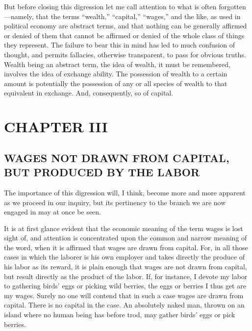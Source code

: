 But before closing this digression let me call attention to what is
often forgotten---namely, that the terms ``wealth,'' ``capital,''
``wages,'' and the like, as used in political economy are abstract
terms, and that nothing can be generally affirmed or denied of them that
cannot be affirmed or denied of the whole class of things they
represent. The failure to bear this in mind has led to much confusion of
thought, and permits fallacies, otherwise transparent, to pass for
obvious truths. Wealth being an abstract term, the idea of wealth, it
must be remembered, involves the idea of exchange ability. The
possession of wealth to a certain amount is potentially the possession
of any or all species of wealth to that equivalent in exchange. And,
consequently, so of capital.

\newpage

\hypertarget{Book1Chapter3}{%
\section{CHAPTER III}\label{Book1Chapter3}}

\hypertarget{wages-not-drawn-from-capital-but-produced-by-the-labor}{%
\subsection{WAGES NOT DRAWN FROM CAPITAL, BUT PRODUCED BY THE
LABOR}\label{wages-not-drawn-from-capital-but-produced-by-the-labor}}

The importance of this digression will, I think, become more and more
apparent as we proceed in our inquiry, but its pertinency to the branch
we are now engaged in may at once be seen.

It is at first glance evident that the economic meaning of the term
wages is lost sight of, and attention is concentrated upon the common
and narrow meaning of the word, when it is affirmed that wages are drawn
from capital. For, in all those cases in which the laborer is his own
employer and takes directly the produce of his labor as its reward, it
is plain enough that wages are not drawn from capital, but result
directly as the product of the labor. If, for instance, I devote my
labor to gathering birds' eggs or picking wild berries, the eggs or
berries I thus get are my wages. Surely no one will contend that in such
a case wages are drawn from capital. There is no capital in the case. An
absolutely naked man, thrown on an island where no human being has
before trod, may gather birds' eggs or pick berries.

